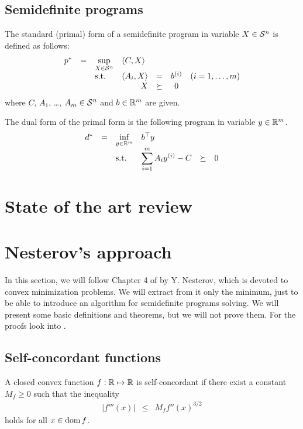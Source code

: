 \subsection{Semidefinite programs}
The standard (primal) form of a semidefinite program in variable $X\in\mathcal{S}^n$ is defined as follows:
\begin{eqnarray}
  \begin{array}{rclrrclcll}
    p^* &=& \displaystyle \sup_{X\in\Sym^n} & \multicolumn{3}{l}{\langle C,X\rangle} \\
    && \text{s.t.} & \langle A_i, X\rangle &=& b\ind i & (i = 1,\ldots,m)\\
    &&& X &\succeq& 0
  \end{array}
\end{eqnarray}
where $C$, $A_1$, \ldots, $A_m \in \mathcal{S}^n$ and $b\in\mathbb{R}^m$ are given.

The dual form of the primal form is the following program in variable $y\in\mathbb{R}^m$.
\begin{eqnarray}
  \begin{array}{rclrrclcll}
    d^* &=& \displaystyle \inf_{y\in\R^m} & \multicolumn{3}{l}{b^\top y} \\
    && \text{s.t.} & \displaystyle \sum_{i=1}^m A_iy\ind i - C &\succeq& 0
  \end{array}\labeleq{SDP:prelim:dual}
\end{eqnarray}

\section{State of the art review}


\section{Nesterov's approach}
In this section, we will follow Chapter 4 of \cite{Nesterov-2004} by Y. Nesterov, which is devoted to convex minimization problems.
We will extract from it only the minimum, just to be able to introduce an algorithm for semidefinite programs solving.
We will present some basic definitions and theorems, but we will not prove them.
For the proofs look into \cite{Nesterov-2004}.

\subsection{Self-concordant functions}
\begin{definition}
  A closed convex function $f: \mathbb{R} \mapsto \mathbb{R}$ is self-concordant if there exist a constant $M_f \geq 0$ such that the inequality
  \begin{eqnarray}
    |f'''(x)| &\leq& M_f f''(x)^{3/2}
  \end{eqnarray}
  holds for all $x\in\operatorname{dom} f$.
\end{definition}

